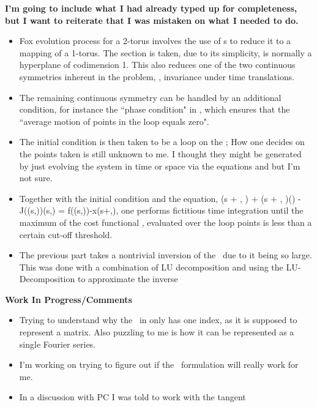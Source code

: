 \begin{description}
{\begin{description}
\textbf{I'm going to include what I had already typed up for completeness,
but I want to reiterate that I was mistaken on what I needed to do.}

\begin{itemize}
\item Fox evolution process for a 2-torus involves the use
of \PoincSec s to reduce it to a mapping of a 1-torus. The
section is taken, due to its simplicity, is normally a hyperplane of
codimension 1. This also reduces one of the two continuous symmetries
inherent in the problem, \ie, invariance under time translations.
\item The remaining  continuous symmetry can be handled by an
additional condition, for instance the ``phase condition" in
, which ensures that the ``average motion of points
in the loop equals zero".
\item The initial condition is then taken to be a loop on the \PoincSec; How one decides on the points taken is still unknown to me. I
thought they might be generated by just evolving the system in time or space
via the equations  and  but I'm not sure.
\item Together with the initial condition and the {\descent} equation,
\beq
\frac{\partial \conf}{\partial \tau}(s + \omega, \tau) + (s + \omega, \tau)\frac{\partial \omega}{\partial \tau}(\tau) - J(\conf(s,\tau))\frac{\partial \conf}{\partial \tau}(s,\tau) =
f(\conf (s,\tau))-x(s+\omega,\tau),
one performs fictitious time integration until the maximum of the cost
functional , evaluated over the loop points is less than a
certain cut-off threshold. \item The previous part takes a nontrivial inversion
of the \jacobianM\ due to it being so large. This was done with a combination
of LU decomposition and using the LU-Decomposition to approximate the inverse
\end{itemize}
\textbf{Work In Progress/Comments}
\begin{itemize}
\item Trying to understand why the \jacobianM\ in  only has one
index, as it is supposed to represent a matrix. Also puzzling to me is how
it can be represented as a single Fourier series.
\item I'm working on trying to figure out if the \PoincSec\
formulation will really work for me.
\item In a discussion with PC I was told to work with the tangent

\end{itemize}
\end{description}}
\end{description}
